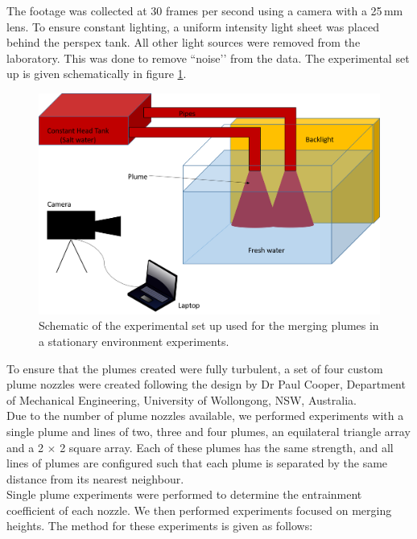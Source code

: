 \documentclass{jfm}
\begin{document}
	\noindent The footage was collected at 30 frames per second using a camera with a 25\,mm lens. To ensure constant lighting, a uniform intensity light sheet was placed behind the perspex tank. All other light sources were removed from the laboratory. This was done to remove ``noise’’ from the data. The experimental set up is given schematically in figure \ref{fig:L2Schematic}.
    \begin{figure}
		\centering
		\includegraphics[width=\textwidth]{L2Schematic.png}
		\caption{ Schematic of the experimental set up used for the merging plumes in a stationary environment experiments.}
		\label{fig:L2Schematic}
	\end{figure} 
	To ensure that the plumes created were fully turbulent, a set of four custom plume nozzles were created following the design by Dr Paul Cooper, Department of Mechanical Engineering, University of Wollongong, NSW, Australia.\\
	
	\noindent Due to the number of plume nozzles available, we performed experiments with a single plume and lines of two, three and four plumes, an equilateral triangle array and a 2 $\times$  2 square array. Each of these plumes has the same strength, and all lines of plumes are configured such that each plume is separated by the same distance from its nearest neighbour. \\
	
	\noindent Single plume experiments were performed to determine the entrainment coefficient of each nozzle. We then performed experiments focused on merging heights. The method for these experiments is given as follows:
	
\end{document}
